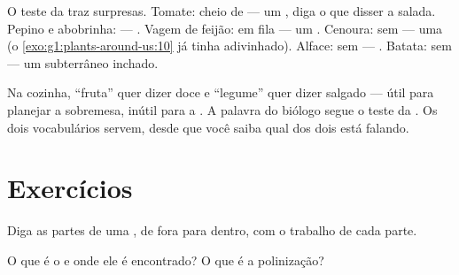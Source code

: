 \begin{example}\label{ex:g3:flowers-fruits-seeds:surprise}
O teste da  traz surpresas. Tomate: cheio de  --- um
, diga o que disser a salada. Pepino e abobrinha:  ---
. Vagem de feijão:  em fila --- um . Cenoura: sem
 --- uma  (o \cref{exo:g1:plants-around-us:10} já tinha
adivinhado). Alface: sem  --- . Batata: sem 
--- um  subterrâneo inchado.
\end{example}

\begin{remark}\label{rem:g3:flowers-fruits-seeds:words}
Na cozinha, ``fruta'' quer dizer doce e ``legume'' quer dizer
salgado --- útil para planejar a sobremesa, inútil para a .
A palavra do biólogo segue o teste da . Os dois vocabulários
servem, desde que você saiba qual dos dois está falando.
\end{remark}

\section{Exercícios}

\begin{exercise}[$\star$]\label{exo:g3:flowers-fruits-seeds:1}
Diga as partes de uma , de fora para dentro, com o trabalho de
cada parte.
\end{exercise}

\begin{exercise}[$\star$]\label{exo:g3:flowers-fruits-seeds:2}
O que é o  e onde ele é encontrado? O que é a polinização?
\end{exercise}

